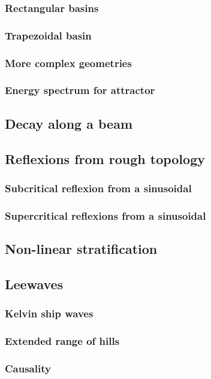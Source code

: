 \subsubsection{Rectangular basins}
\subsubsection{Trapezoidal basin}
\subsubsection{More complex geometries}
\subsubsection{Energy spectrum for attractor}

\subsection{Decay along a beam}

\subsection{Reflexions from rough topology}
\subsubsection{Subcritical reflexion from a sinusoidal}
\subsubsection{Supercritical reflexions from a sinusoidal}

\subsection{Non-linear stratification}

\subsection{Leewaves}
\subsubsection{Kelvin ship waves}
\subsubsection{Extended range of hills}
\subsubsection{Causality}

